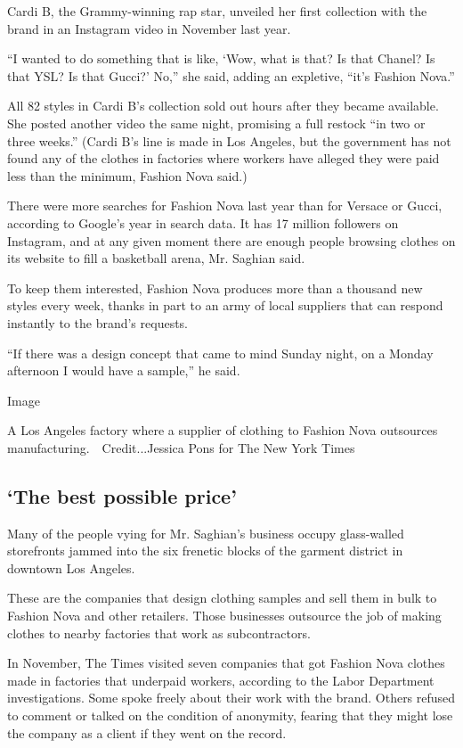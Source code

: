 Cardi B, the Grammy-winning rap star, unveiled her first collection with
the brand in an Instagram video in November last year.

``I wanted to do something that is like, `Wow, what is that? Is that
Chanel? Is that YSL? Is that Gucci?' No,'' she said, adding an
expletive, ``it's Fashion Nova.''

All 82 styles in Cardi B's collection sold out hours after they became
available. She posted another video the same night, promising a full
restock ``in two or three weeks.'' (Cardi B's line is made in Los
Angeles, but the government has not found any of the clothes in
factories where workers have alleged they were paid less than the
minimum, Fashion Nova said.)

There were more searches for Fashion Nova last year than for Versace or
Gucci, according to Google's year in search data. It has 17 million
followers on Instagram, and at any given moment there are enough people
browsing clothes on its website to fill a basketball arena, Mr. Saghian
said.

To keep them interested, Fashion Nova produces more than a thousand new
styles every week, thanks in part to an army of local suppliers that can
respond instantly to the brand's requests.

``If there was a design concept that came to mind Sunday night, on a
Monday afternoon I would have a sample,'' he said.

Image

A Los Angeles factory where a supplier of clothing to Fashion Nova
outsources manufacturing.~~Credit...Jessica Pons for The New York Times

\hypertarget{the-best-possible-price}{%
\subsection{`The best possible price'}\label{the-best-possible-price}}

Many of the people vying for Mr. Saghian's business occupy glass-walled
storefronts jammed into the six frenetic blocks of the garment district
in downtown Los Angeles.

These are the companies that design clothing samples and sell them in
bulk to Fashion Nova and other retailers. Those businesses outsource the
job of making clothes to nearby factories that work as subcontractors.

In November, The Times visited seven companies that got Fashion Nova
clothes made in factories that underpaid workers, according to the Labor
Department investigations. Some spoke freely about their work with the
brand. Others refused to comment or talked on the condition of
anonymity, fearing that they might lose the company as a client if they
went on the record.

